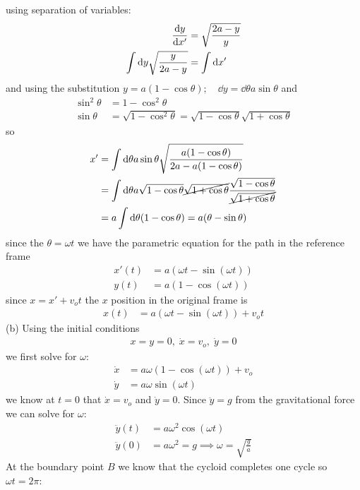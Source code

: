 \documentclass[../hw.tex]{subfiles}
\begin{document}
using separation of variables:
\begin{align*}
    \dv{y}{x'} &= \sqrt{\frac{2a - y}{y}} \\
    \int \dd y \sqrt{\frac{y}{2a - y}}  &= \int \dd x'
\end{align*}
and using the substitution $y = a(1 - \cos\theta);\quad \dd y = \dd \theta a\sin\theta $ and
\begin{align*}
    \sin^2\theta &= 1 - \cos^2\theta \\
    \sin\theta &= \sqrt{1 - \cos^2\theta} = \sqrt{1 - \cos\theta} \sqrt{1 + \cos\theta}
\end{align*}
so 
\begin{align*}
    x' &= \int \dd \theta a \sin\theta \sqrt{\frac{a(1 - \cos\theta)}{2a - a(1 - \cos\theta)}} \\
    &= \int \dd \theta a \sqrt{1 - \cos\theta} \cancel{\sqrt{1 + \cos\theta}}
      \frac{\sqrt{1 - \cos\theta}}{\cancel{\sqrt{1 + \cos\theta}}} \\
    &= a \int \dd \theta (1 - \cos\theta) = a (\theta - \sin\theta)
\end{align*}
since the $\theta = \omega t$ we have the parametric equation for the path in the reference frame
\begin{align*}
    x'(t) &= a(\omega t - \sin(\omega t)) \\
    y(t) &= a(1 - \cos(\omega t))
\end{align*}
since $x = x' + v_o t$ the $x$ position in the original frame is
\begin{align*}
    x(t) &= a(\omega t - \sin(\omega t)) + v_o t
\end{align*}
(b) Using the initial conditions
\begin{align*}
    x = y = 0, \; \dot x = v_o, \; \dot y = 0
\end{align*}
we first solve for $\omega$:
\begin{align*}
    \dot x &= a\omega(1 - \cos(\omega t)) + v_o \\
    \dot y &= a\omega\sin(\omega t)
\end{align*}
we know at $t = 0$ that $\dot x = v_o$ and $\dot y = 0$. Since $\ddot y = g$ from the gravitational
force we can solve for $\omega$:
\begin{align*}
    \ddot y(t) &= a\omega^2\cos(\omega t) \\
    \ddot y(0) &= a\omega^2 = g \implies \omega = \sqrt{\frac{g}{a}}
\end{align*}
At the boundary point $B$ we know that the cycloid completes one cycle so $\omega t = 2\pi$:
\end{document}
